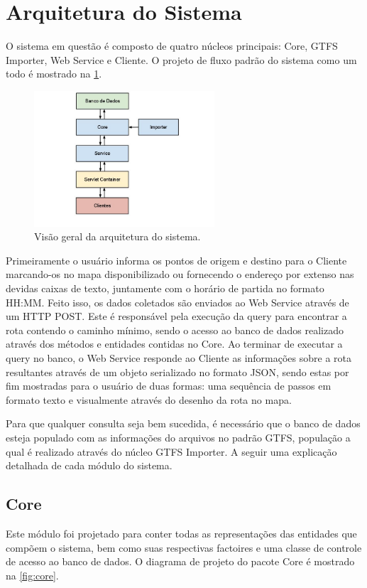 \section{Arquitetura do Sistema}
O sistema em questão é composto de quatro núcleos principais: Core, GTFS Importer, Web Service e Cliente. 
O projeto de fluxo padrão do sistema como um todo é mostrado na \ref{fig:arquitetura}.

\begin{figure}[!htb]
	\centering
	\includegraphics[width=0.6\textwidth]{./arquitetura.jpg}
	\caption[ImgArquitetura]{Visão geral da arquitetura do sistema.}
	\label{fig:arquitetura}
\end{figure}

Primeiramente o usuário informa os pontos de origem e destino para o Cliente marcando-os no mapa disponibilizado ou fornecendo o endereço por extenso nas devidas caixas de texto, juntamente com o horário de partida no formato HH:MM. 
Feito isso, os dados coletados são enviados ao Web Service através de um HTTP POST. 
Este é responsável pela execução da query para encontrar a rota contendo o caminho mínimo, sendo o acesso ao banco de dados realizado através dos métodos e entidades contidas no Core.
Ao terminar de executar a query no banco, o Web Service responde ao Cliente as informações sobre a rota resultantes através de um objeto serializado no formato JSON, sendo estas por fim mostradas para o usuário de duas formas: uma sequência de passos em formato texto e visualmente através do desenho da rota no mapa.

Para que qualquer consulta seja bem sucedida, é necessário que o banco de dados esteja populado com as informações do arquivos no padrão GTFS, população a qual é realizado através do núcleo GTFS Importer.
A seguir uma explicação detalhada de cada módulo do sistema.

\subsection{Core}
Este módulo foi projetado para conter todas as representações das entidades que compõem o sistema, bem como suas respectivas factoires e uma classe de controle de acesso ao banco de dados.
O diagrama de projeto do pacote Core é mostrado na \ref{fig:core}.

